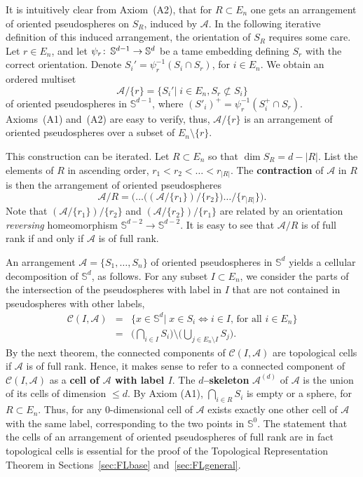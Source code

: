 \documentclass[a4paper]{amsart}
\def\co{\colon\thinspace}
\newcommand{\begriff}[1]{\textbf{#1}}
\newcommand{\p}{\mathbb S}
\newcommand{\C}{\mathcal C}
\theoremstyle{definition}
\theoremstyle{remark}
\begin{document}
It is intuitively clear from Axiom~(A2), that for $R\subset E_n$ one
gets an arrangement of oriented pseudospheres on $S_R$, induced by
$\mathcal A$. 
In the following iterative definition of this induced arrangement, the
orientation of $S_R$ requires some care.
%
Let $r\in E_n$, and let $\psi_r\co \p^{d-1}\to\p^d$ be a tame embedding
defining $S_r$ with the correct orientation.
Denote $S_i' = \psi_r^{-1}(S_i\cap S_r)$, for $i\in E_n$.  We obtain
an ordered multiset
$$ \mathcal A/\{r\} = \{ S_i' |\; i\in E_n, S_r\not\subset S_i \}$$
of oriented pseudospheres in $\p^{d-1}$, where $(S'_i)^+ =
\psi_r^{-1}(S^+_i\cap S_r)$. Axioms~(A1) and~(A2) are easy to verify,
thus, $\mathcal A/\{r\}$ is an arrangement of oriented pseudospheres
over a subset of $E_n\setminus \{r\}$.

This construction can be iterated. Let $R\subset E_n$ so that $\dim S_R
= d - |R|$. List the elements of $R$ in ascending order, $r_1< r_2< \dots<
r_{|R|}$. 
The \begriff{contraction} of $\mathcal A$ in $R$ is then the arrangement
of oriented pseudospheres 
$$\mathcal A/R = \Big(\dots\big((\mathcal A/\{r_1\}) \big/
\{r_2\}\big)\dots \Big/ \{r_{|R|}\}\Big).$$
Note that $(\mathcal A/\{r_1\})/\{r_2\}$ and $(\mathcal
A/\{r_2\})/\{r_1\}$ are related by an orientation \emph{reversing}
homeomorphism $\p^{d-2}\to\p^{d-2}$.
It is easy to see that $\mathcal A/ R$ is of full rank if and only if
$\mathcal A$ is of full rank. 

An arrangement $\mathcal A=\{S_1,\dots, S_n\}$ of oriented pseudospheres
in $\p^d$ yields a cellular decomposition of $\p^d$, as follows.
%
For any subset $I\subset E_n$, we consider the parts of the intersection
of the pseudospheres with label in $I$ that are not contained in
pseudospheres with other labels,
\begin{eqnarray*}
 \C(I,\mathcal A) &=& \big\{x \in \p^d | \; x\in S_i \iff i\in I \text{, for
  all } i \in E_n\big\}\\
  &=& \big(\bigcap_{i\in I} S_i\big)\setminus \big(\bigcup_{j\in
    E_n\setminus I} S_j\big).
\end{eqnarray*} 
%
By the next theorem, the connected
components of $\C(I,\mathcal A)$ are topological cells if $\mathcal A$
is of full rank. 
Hence, it makes sense to refer to a connected component of
$\C(I,\mathcal A)$ as a \begriff{cell of $\mathcal A$ with label $I$}.   The 
\begriff{$d$--skeleton} $\mathcal A^{(d)}$ of $\mathcal A$ is the union of 
its cells of dimension $\le d$. 
%
By Axiom (A1), $\bigcap_{i\in R} S_i$ is empty or a sphere, for
$R\subset E_n$. Thus, for any
$0$-dimen\-sio\-nal cell of $\mathcal A$  exists exactly one other
cell of $\mathcal A$ with the same label, corresponding to the two
points in $\p^0$.  
%
The statement that the cells of an arrangement of oriented pseudospheres
of full rank are in fact topological cells is essential for the proof of
the Topological Representation Theorem in Sections~\ref{sec:FLbase}
and~\ref{sec:FLgeneral}.  
\end{document}
